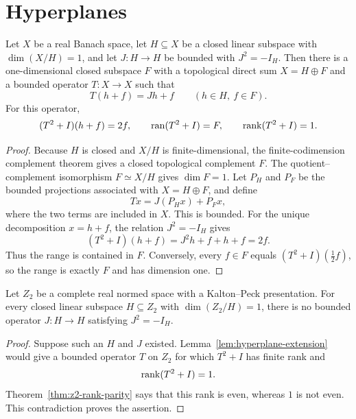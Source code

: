 \section{Hyperplanes}

\begin{lemma}\label{lem:hyperplane-extension}
Let $X$ be a real Banach space, let $H\subseteq X$ be a closed linear subspace with
$\dim(X/H)=1$, and let $J:H\to H$ be bounded with $J^2=-I_H$.  Then there is a one-dimensional
closed subspace $F$ with a topological direct sum $X=H\oplus F$ and a bounded operator $T:X\to X$
such that
\[
  T(h+f)=Jh+f\qquad(h\in H,\ f\in F).
\]
For this operator,
\[
  (T^2+I)(h+f)=2f,
  \qquad
  \operatorname{ran}(T^2+I)=F,
  \qquad
  \operatorname{rank}(T^2+I)=1.
\]
\leanok
\end{lemma}

\begin{proof}
Because $H$ is closed and $X/H$ is finite-dimensional, the finite-codimension complement theorem
gives a closed topological complement $F$.  The quotient--complement isomorphism $F\simeq X/H$
gives $\dim F=1$.  Let $P_H$ and $P_F$ be the bounded projections associated with
$X=H\oplus F$, and define
\[
  Tx=J(P_Hx)+P_Fx,
\]
where the two terms are included in $X$.  This is bounded.  For the unique decomposition $x=h+f$,
the relation $J^2=-I_H$ gives
\[
  (T^2+I)(h+f)=J^2h+f+h+f=2f.
\]
Thus the range is contained in $F$.  Conversely, every $f\in F$ equals
$(T^2+I)(\tfrac12f)$, so the range is exactly $F$ and has dimension one.
\end{proof}

\begin{theorem}\label{thm:no-hyperplane-complex}
Let $Z_2$ be a complete real normed space with a Kalton--Peck presentation.  For every closed linear
subspace $H\subseteq Z_2$ with $\dim(Z_2/H)=1$, there is no bounded operator $J:H\to H$ satisfying
$J^2=-I_H$.
\leanok
\end{theorem}

\begin{proof}
Suppose such an $H$ and $J$ existed.  Lemma~\ref{lem:hyperplane-extension} would give a bounded
operator $T$ on $Z_2$ for which $T^2+I$ has finite rank and
\[
  \operatorname{rank}(T^2+I)=1.
\]
Theorem~\ref{thm:z2-rank-parity} says that this rank is even, whereas $1$ is not even.  This
contradiction proves the assertion.
\end{proof}
